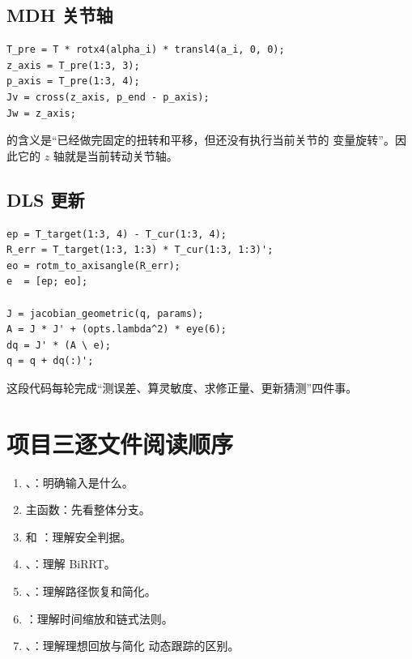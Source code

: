 \subsection{MDH 关节轴}

\begin{lstlisting}
T_pre = T * rotx4(alpha_i) * transl4(a_i, 0, 0);
z_axis = T_pre(1:3, 3);
p_axis = T_pre(1:3, 4);
Jv = cross(z_axis, p_end - p_axis);
Jw = z_axis;
\end{lstlisting}

 的含义是“已经做完固定的扭转和平移，但还没有执行当前关节的
变量旋转”。因此它的 $z$ 轴就是当前转动关节轴。

\subsection{DLS 更新}

\begin{lstlisting}
ep = T_target(1:3, 4) - T_cur(1:3, 4);
R_err = T_target(1:3, 1:3) * T_cur(1:3, 1:3)';
eo = rotm_to_axisangle(R_err);
e  = [ep; eo];

J = jacobian_geometric(q, params);
A = J * J' + (opts.lambda^2) * eye(6);
dq = J' * (A \ e);
q = q + dq(:)';
\end{lstlisting}

这段代码每轮完成“测误差、算灵敏度、求修正量、更新猜测”四件事。

\section{项目三逐文件阅读顺序}

\begin{enumerate}
  \item {}、：明确输入是什么。
  \item {} 主函数：先看整体分支。
  \item {} 和 ：理解安全判据。
  \item {}、：理解 BiRRT。
  \item {}、：理解路径恢复和简化。
  \item {}：理解时间缩放和链式法则。
  \item {}、：理解理想回放与简化
  动态跟踪的区别。
\end{enumerate}

